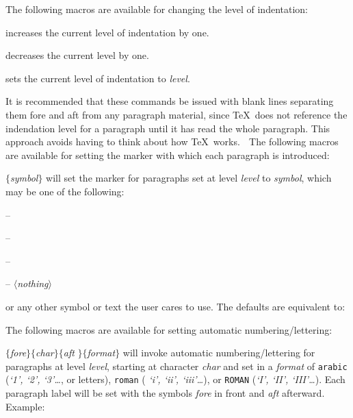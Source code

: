 The following macros are available for changing the level of indentation:

\incindent

 increases the current level of indentation by one.

 decreases the current level by one.

 sets the current level of indentation to 
{\it level}.  

\decindent

It is recommended that these commands be issued with blank lines separating
them fore and aft from any paragraph material, since \TeX\ does not reference
the indendation level for a paragraph until it has read the whole paragraph.
This approach avoids having to think about how \TeX\ works. 

\filbreak
The following macros are available for setting the marker with which each 
paragraph is introduced:

\incindent

$\{${\it symbol}$\}$ will set the marker for 
paragraphs set at level {\it level} to {\it symbol}, which may be one of 
the following:
\medskip
\incindent\closeup

 -- \markbullet

 -- \markthindash

 -- \markthickdash

 -- $\langle${\it nothing}$\rangle$

\endcloseup\decindent

or any other symbol or text the user cares to use.
\filbreak
The defaults are equivalent to:
\medskip
\incindent\closeup






\endcloseup\decindent

\decindent

\filbreak
The following macros are available for setting automatic numbering/let\-tering: 

\incindent

$\{${\it fore}$\}\{${\it char}$\}\{${\it aft}%
$\}\{${\it format}$\}$ will invoke automatic numbering/lettering for 
paragraphs at level {\it level}, starting at character {\it char} and set 
in a {\it format} of {\tt arabic} ({\it `1', `2', `3'\dots}, or letters),
{\tt roman} ({\it
`i', `ii', `iii'\dots}), or {\tt ROMAN} ({\it `I', `II', `III'\dots}).
Each paragraph label will be set with the symbols {\it fore} in
front and {\it aft} afterward.  Example:


